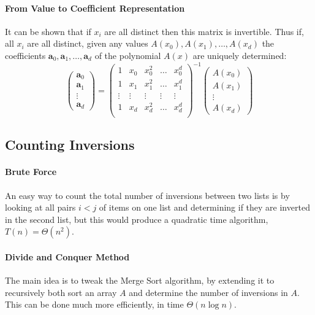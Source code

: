 \paragraph{From Value to Coefficient Representation} It can be shown that if \(x_i\) are 
all distinct then this matrix is invertible.
Thus if, all \(x_i\) are all distinct, given any values \(A(x_0), A(x_1), \dots, A(x_d)\)
the coefficients \(\boldsymbol{a}_0, \boldsymbol{a}_1, \dots, \boldsymbol{a}_d\) of the 
polynomial \(A(x)\) are uniquely determined:
\[
\begin{pmatrix}
\boldsymbol{a}_0 \\
\boldsymbol{a}_1 \\
\vdots \\
\boldsymbol{a}_d
\end{pmatrix}
=
\begin{pmatrix}
1 & x_0 & x_0^2 & \dots & x_0^d\\
1 & x_1 & x_1^2 & \dots & x_1^d\\
\vdots & \vdots & \vdots & \vdots & \vdots\\
1 & x_d & x_d^2 & \dots & x_d^d\\
\end{pmatrix}^{-1}
\begin{pmatrix}
A(x_0) \\
A(x_1) \\
\vdots \\
A(x_d)
\end{pmatrix}
\]

\subsection{Counting Inversions}
\paragraph{Brute Force}
An easy way to count the total number of inversions between two lists is by looking
at all pairs \(i < j\) of items on one list and determining if they are inverted 
in the second list, but this would produce a quadratic time algorithm, 
\(T(n) = \Theta(n^2)\).

\paragraph{Divide and Conquer Method} 
The main idea is to tweak the Merge Sort  algorithm, by extending it to recursively 
both sort an array \(A\) and determine the number of inversions in \(A\). 
This can be done much more efficiently, in time \(\Theta(n\log n)\).

